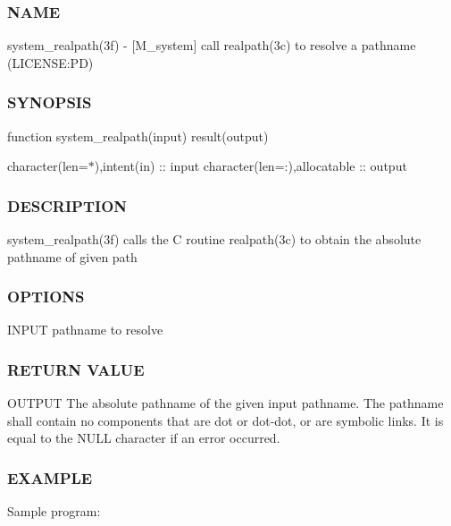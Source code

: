 \subsubsection*{N\+A\+ME}

system\+\_\+realpath(3f) -\/ \mbox{[}M\+\_\+system\mbox{]} call realpath(3c) to resolve a pathname (L\+I\+C\+E\+N\+SE\+:PD) \subsubsection*{S\+Y\+N\+O\+P\+S\+IS}

function system\+\_\+realpath(input) result(output)

character(len=$\ast$),intent(in) \+:\+: input character(len=\+:),allocatable \+:\+: output \subsubsection*{D\+E\+S\+C\+R\+I\+P\+T\+I\+ON}

system\+\_\+realpath(3f) calls the C routine realpath(3c) to obtain the absolute pathname of given path \subsubsection*{O\+P\+T\+I\+O\+NS}

\begin{DoxyVerb}    INPUT     pathname to resolve
\end{DoxyVerb}


\subsubsection*{R\+E\+T\+U\+RN V\+A\+L\+UE}

O\+U\+T\+P\+UT The absolute pathname of the given input pathname. The pathname shall contain no components that are dot or dot-\/dot, or are symbolic links. It is equal to the N\+U\+LL character if an error occurred.

\subsubsection*{E\+X\+A\+M\+P\+LE}

Sample program\+:

